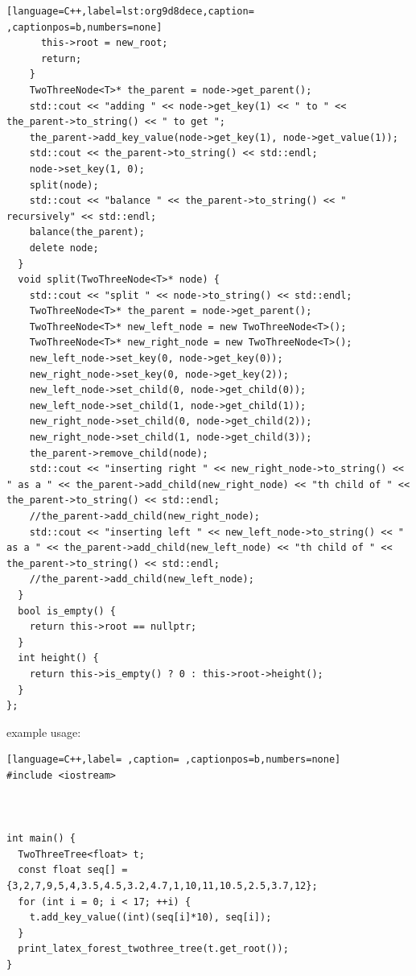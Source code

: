 \documentclass[a4paper,12pt]{article}
\begin{document}
\begin{lstlisting}[language=C++,label=lst:org9d8dece,caption= ,captionpos=b,numbers=none]
      this->root = new_root;
      return;
    }
    TwoThreeNode<T>* the_parent = node->get_parent();
    std::cout << "adding " << node->get_key(1) << " to " << the_parent->to_string() << " to get ";
    the_parent->add_key_value(node->get_key(1), node->get_value(1));
    std::cout << the_parent->to_string() << std::endl;
    node->set_key(1, 0);
    split(node);
    std::cout << "balance " << the_parent->to_string() << " recursively" << std::endl;
    balance(the_parent);
    delete node;
  }
  void split(TwoThreeNode<T>* node) {
    std::cout << "split " << node->to_string() << std::endl;
    TwoThreeNode<T>* the_parent = node->get_parent();
    TwoThreeNode<T>* new_left_node = new TwoThreeNode<T>();
    TwoThreeNode<T>* new_right_node = new TwoThreeNode<T>();
    new_left_node->set_key(0, node->get_key(0));
    new_right_node->set_key(0, node->get_key(2));
    new_left_node->set_child(0, node->get_child(0));
    new_left_node->set_child(1, node->get_child(1));
    new_right_node->set_child(0, node->get_child(2));
    new_right_node->set_child(1, node->get_child(3));
    the_parent->remove_child(node);
    std::cout << "inserting right " << new_right_node->to_string() << " as a " << the_parent->add_child(new_right_node) << "th child of " << the_parent->to_string() << std::endl;
    //the_parent->add_child(new_right_node);
    std::cout << "inserting left " << new_left_node->to_string() << " as a " << the_parent->add_child(new_left_node) << "th child of " << the_parent->to_string() << std::endl;
    //the_parent->add_child(new_left_node);
  }
  bool is_empty() {
    return this->root == nullptr;
  }
  int height() {
    return this->is_empty() ? 0 : this->root->height();
  }
};
\end{lstlisting}

example usage:\\[0pt]

\begin{lstlisting}[language=C++,label= ,caption= ,captionpos=b,numbers=none]
#include <iostream>



int main() {
  TwoThreeTree<float> t;
  const float seq[] = {3,2,7,9,5,4,3.5,4.5,3.2,4.7,1,10,11,10.5,2.5,3.7,12};
  for (int i = 0; i < 17; ++i) {
    t.add_key_value((int)(seq[i]*10), seq[i]);
  }
  print_latex_forest_twothree_tree(t.get_root());
}
\end{lstlisting}
\end{document}
